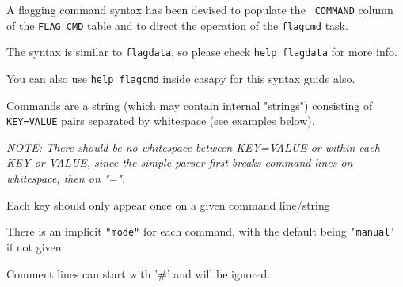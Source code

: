 A flagging command syntax has been devised to populate the {\tt
COMMAND} column of the {\tt FLAG\_CMD} table and to direct the 
operation of the {\tt flagcmd} task.

The syntax is similar to {\tt flagdata}, so please check {\tt help
  flagdata} for more info. 

You can also use {\tt help flagcmd} inside casapy for this syntax guide also.

Commands are a string (which may contain internal "strings")
consisting of {\tt KEY=VALUE} pairs separated by whitespace (see examples
below).

{\it NOTE: There should be no whitespace between KEY=VALUE or within each
KEY or VALUE, since the simple parser first breaks command lines on
whitespace, then on "=".}
        
Each key should only appear once on a given command line/string
        
There is an implicit {\tt "mode"} for each command, with the default being
{\tt 'manual'} if not given.

Comment lines can start with '\#' and will be ignored.
     

